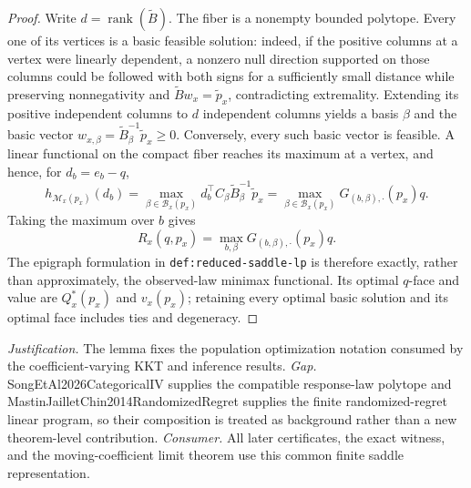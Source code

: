 \documentclass{article}
\begin{document}
\begin{proof}
Write \(d=\operatorname{rank}(\widetilde B)\).  The fiber is a nonempty bounded polytope.  Every one of its vertices is a basic feasible solution: indeed, if the positive columns at a vertex were linearly dependent, a nonzero null direction supported on those columns could be followed with both signs for a sufficiently small distance while preserving nonnegativity and \(\widetilde B w_x=\widetilde p_x\), contradicting extremality.  Extending its positive independent columns to \(d\) independent columns yields a basis \(\beta\) and the basic vector \(w_{x,\beta}=\widetilde B_\beta^{-1}\widetilde p_x\geq0\).  Conversely, every such basic vector is feasible.  A linear functional on the compact fiber reaches its maximum at a vertex, and hence, for \(d_b=e_b-q\),
\[
 h_{\mathcal M_x(p_x)}(d_b)
 =\max_{\beta\in\mathcal B_x(p_x)}d_b^\top C_\beta\widetilde B_\beta^{-1}\widetilde p_x
 =\max_{\beta\in\mathcal B_x(p_x)}G_{(b,\beta),\cdot}(p_x)q.
\]
Taking the maximum over \(b\) gives
\[
 R_x(q,p_x)=\max_{b,\beta}G_{(b,\beta),\cdot}(p_x)q.
\]
The epigraph formulation in \texttt{def:reduced-saddle-lp} is therefore exactly, rather than approximately, the observed-law minimax functional.  Its optimal \(q\)-face and value are \(Q_x^*(p_x)\) and \(v_x(p_x)\); retaining every optimal basic solution and its optimal face includes ties and degeneracy.
\end{proof}
\par\smallskip\noindent \textit{Justification.} The lemma fixes the population optimization notation consumed by the coefficient-varying KKT and inference results. \textit{Gap.} SongEtAl2026CategoricalIV supplies the compatible response-law polytope and MastinJailletChin2014RandomizedRegret supplies the finite randomized-regret linear program, so their composition is treated as background rather than a new theorem-level contribution. \textit{Consumer.} All later certificates, the exact witness, and the moving-coefficient limit theorem use this common finite saddle representation.
\end{document}
